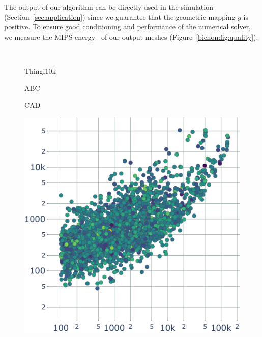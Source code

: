 The output of our algorithm can be directly used in {the} simulation (Section~\ref{sec:application}) since we guarantee that the geometric mapping $g$ is positive. To ensure good conditioning and performance of the numerical solver, we measure the MIPS energy~\cite{hormann2000mips,fu2015computing} of our output meshes (Figure~\ref{bichon:fig:quality}). 

\begin{figure}
    \centering
    \parbox{0.02\linewidth}{~}\hfill\hfill
    \parbox{.3\linewidth}{\centering Thingi10k}\hfill
    \parbox{.3\linewidth}{\centering ABC}\hfill
    \parbox{.3\linewidth}{\centering CAD}\par
    \parbox{0.02\linewidth}{\centering{}}\hfill\hfill
    \parbox{.3\linewidth}{\includegraphics[width=\linewidth]{curve_meshing_in_shell_tex/figs/stats/time_Thingi10k}}\hfill

\end{figure}
